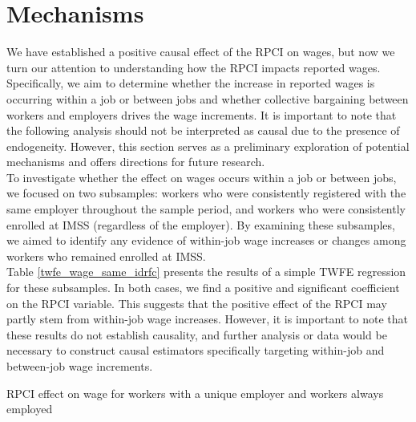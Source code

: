 \documentclass[10pt, oneside]{book}
\begin{document}
\normalsize

\section{Mechanisms}

We have established a positive causal effect of the RPCI on wages, but now we turn our attention to understanding how the RPCI impacts reported wages. Specifically, we aim to determine whether the increase in reported wages is occurring within a job or between jobs and whether collective bargaining between workers and employers drives the wage increments. It is important to note that the following analysis should not be interpreted as causal due to the presence of endogeneity. However, this section serves as a preliminary exploration of potential mechanisms and offers directions for future research. \\

To investigate whether the effect on wages occurs within a job or between jobs, we focused on two subsamples: workers who were consistently registered with the same employer throughout the sample period, and workers who were consistently enrolled at IMSS (regardless of the employer). By examining these subsamples, we aimed to identify any evidence of within-job wage increases or changes among workers who remained enrolled at IMSS. \\

Table \ref{twfe_wage_same_idrfc} presents the results of a simple TWFE regression for these subsamples. In both cases, we find a positive and significant coefficient on the RPCI variable. This suggests that the positive effect of the RPCI may partly stem from within-job wage increases. However, it is important to note that these results do not establish causality, and further analysis or data would be necessary to construct causal estimators specifically targeting within-job and between-job wage increments. \\

\begin{table}[H]
    \caption{RPCI effect on wage for workers with a unique employer and workers always employed}
    \label{twfe_wage_same_idrfc}
    \begin{center}
    \scriptsize{}
    \end{center}
\end{table}
\end{document}
